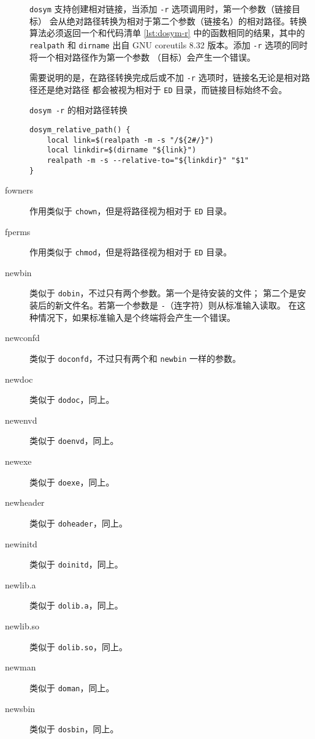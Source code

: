 \begin{description}
    \texttt{dosym} 支持创建相对链接，当添加 \texttt{-r} 选项调用时，第一个参数（链接目标）
    会从绝对路径转换为相对于第二个参数（链接名）的相对路径。转换算法必须返回一个和代码清单
    \ref{lst:dosym-r} 中的函数相同的结果，其中的 \texttt{realpath} 和 \texttt{dirname} 出自
    GNU coreutils 8.32 版本。添加 \texttt{-r} 选项的同时将一个相对路径作为第一个参数
    （目标）会产生一个错误。

    需要说明的是，在路径转换完成后或不加 \texttt{-r} 选项时，链接名无论是相对路径还是绝对路径
    都会被视为相对于 \texttt{ED} 目录，而链接目标始终不会。

\begin{listing}[h]
\caption{\texttt{dosym -r} 的相对路径转换} \label{lst:dosym-r}
\begin{verbatim}
dosym_relative_path() {
    local link=$(realpath -m -s "/${2#/}")
    local linkdir=$(dirname "${link}")
    realpath -m -s --relative-to="${linkdir}" "$1"
}
\end{verbatim}
\end{listing}

\item[fowners] 作用类似于 \texttt{chown}，但是将路径视为相对于 \texttt{ED} 目录。

\item[fperms] 作用类似于 \texttt{chmod}，但是将路径视为相对于 \texttt{ED} 目录。

\item[newbin] 类似于 \texttt{dobin}，不过只有两个参数。第一个是待安装的文件；
    第二个是安装后的新文件名。若第一个参数是 \texttt{-}（连字符）则从标准输入读取。
    在这种情况下，如果标准输入是个终端将会产生一个错误。

\item[newconfd] 类似于 \texttt{doconfd}，不过只有两个和 \texttt{newbin} 一样的参数。

\item[newdoc] 类似于 \texttt{dodoc}，同上。

\item[newenvd] 类似于 \texttt{doenvd}，同上。

\item[newexe] 类似于 \texttt{doexe}，同上。

\item[newheader] 类似于 \texttt{doheader}，同上。

\item[newinitd] 类似于 \texttt{doinitd}，同上。

\item[newlib.a] 类似于 \texttt{dolib.a}，同上。

\item[newlib.so] 类似于 \texttt{dolib.so}，同上。

\item[newman] 类似于 \texttt{doman}，同上。

\item[newsbin] 类似于 \texttt{dosbin}，同上。

\end{description}

